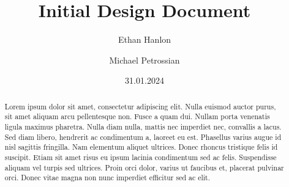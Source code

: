 \documentclass{prace}
\title{Initial Design Document}
\date{31.01.2024}
\author[1]{Ethan Hanlon}
\author[1]{Michael Petrossian}
\affiliation{San Francisco State University, 1600 Holloway Avenue, San Francisco, CA 94132, USA}
\begin{document}
\maketitle

\begin{abstract}
Lorem ipsum dolor sit amet, consectetur adipiscing elit. Nulla euismod auctor purus,
sit amet aliquam arcu pellentesque non. Fusce a quam dui. Nullam porta venenatis ligula
maximus pharetra. Nulla diam nulla, mattis nec imperdiet nec, convallis a lacus. Sed 
diam libero, hendrerit ac condimentum a, laoreet eu est. Phasellus varius augue id nisl
sagittis fringilla. Nam elementum aliquet ultrices. Donec rhoncus tristique felis id
suscipit. Etiam sit amet risus eu ipsum lacinia condimentum sed ac felis. Suspendisse
aliquam vel turpis sed ultrices. Proin orci dolor, varius ut faucibus et, placerat
pulvinar orci. Donec vitae magna non nunc imperdiet efficitur sed ac elit.
\end{abstract}
\end{document}
